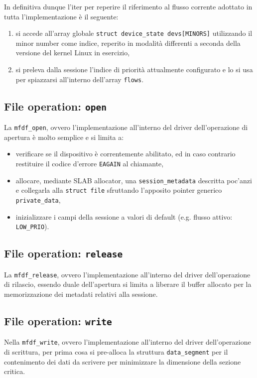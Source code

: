 \documentclass{article}
\begin{document}
In definitiva dunque l'iter per reperire il riferimento al flusso corrente adottato in tutta l'implementazione è il seguente:
\begin{enumerate}
        \item si accede all'array globale \texttt{struct device\_state devs[MINORS]} utilizzando il minor number come indice, reperito in modalità differenti a seconda della versione del kernel Linux in esercizio,
        \item si preleva dalla sessione l'indice di priorità attualmente configurato e lo si usa per spiazzarsi all'interno dell'array \texttt{flows}.
\end{enumerate}

\subsection*{File operation: \texttt{open}}
La \texttt{mfdf\_open}, ovvero l'implementazione all'interno del driver dell'operazione di apertura è molto semplice e si limita a:
\begin{itemize}
        \item verificare se il dispositivo è correntemente abilitato, ed in caso contrario restituire il codice d'errore \texttt{EAGAIN} al chiamante,
        \item allocare, mediante SLAB allocator, una \texttt{session\_metadata} descritta poc'anzi e collegarla alla \texttt{struct file} sfruttando l'apposito pointer generico \texttt{private\_data},
        \item inizializzare i campi della sessione a valori di default (e.g. flusso attivo: \texttt{LOW\_PRIO}).
\end{itemize}

\subsection*{File operation: \texttt{release}}
La \texttt{mfdf\_release}, ovvero l'implementazione all'interno del driver dell'operazione di rilascio, essendo duale dell'apertura si limita a liberare il buffer allocato per la memorizzazione dei metadati relativi alla sessione.

\subsection*{File operation: \texttt{write}}
Nella \texttt{mfdf\_write}, ovvero l'implementazione all'interno del driver dell'operazione di scrittura, per prima cosa si pre-alloca la struttura \texttt{data\_segment} per il contenimento dei dati da scrivere per minimizzare la dimensione della sezione critica.
\end{document}
